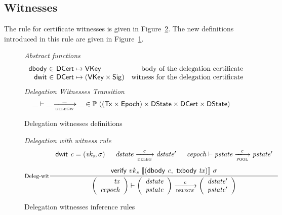 \subsection{Witnesses}
\label{sec:delegation-witnesses}

The rule for certificate witnesses is given in
Figure~\ref{fig:rules:delegationw}. The new definitions introduced in this rule
are given in Figure~\ref{fig:defs:delegationw}.

\begin{figure}
  \emph{Abstract functions}
  \begin{equation*}
    \begin{array}{r@{~\in~}lr}
      \fun{dbody} & \DCert \mapsto \VKey
      & \text{body of the delegation certificate}\\
      \fun{dwit} & \DCert \mapsto (\VKey \times \Sig)
      & \text{witness for the delegation certificate}
    \end{array}
  \end{equation*}
  \emph{Delegation Witnesses Transition}
  \begin{equation*}
    \_ \vdash \_ \trans{delegw}{\_} \_ \in
      \powerset (
        (\Tx \times \Epoch) \times \DState \times \DCert \times \DState)
  \end{equation*}
  \caption{Delegation witnesses definitions}
  \label{fig:defs:delegationw}
\end{figure}

\begin{figure}
  \emph{Delegation with witness rule}
  \begin{equation}
    \label{eq:deleg-witnesses}
    \inference[Deleg-wit]
    { \dwit{c} = (\var{vk_s}, \sigma)
      & \var{dstate} \trans{deleg}{c} \var{dstate'}
      & \var{cepoch} \vdash \var{pstate}
      \trans{pool}{c} \var{pstate'}
      \\ ~ \\
      \verify{vk_s}{\serialised{(\dbody{c},~\txbody \var{tx})}}{\sigma}
    }
    { \left(
      \begin{array}{r}
        \var{tx} \\
        \var{cepoch}
      \end{array}
      \right)
      \vdash
      \left(
      \begin{array}{r}
        \var{dstate} \\
        \var{pstate}
      \end{array}
      \right)
      \trans{delegw}{c}
      \left(
      \begin{array}{rcl}
        \var{dstate'} \\
        \var{pstate'}
      \end{array}
      \right)
    }
  \end{equation}
  \caption{Delegation witnesses inference rules}
  \label{fig:rules:delegationw}
\end{figure}

